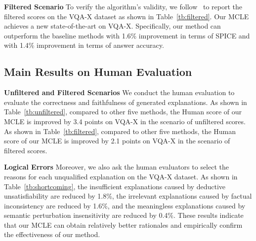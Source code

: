 \documentclass[letterpaper]{article} %
\begin{document}
\noindent
\textbf{Filtered Scenario} To verify the algorithm's validity, we follow~\cite{kayser2021vil} to report the filtered scores on the VQA-X dataset as shown in Table~\ref{tb:filtered}. Our MCLE achieves a new state-of-the-art on VQA-X. Specifically, our method can outperform the baseline methods with 1.6\% improvement in terms of SPICE and with 1.4\% improvement in terms of answer accuracy.

\subsection{Main Results on Human Evaluation}

\noindent
\textbf{Unfiltered and Filtered Scenarios} We conduct the human evaluation to evaluate the correctness and faithfulness of generated explanations. As shown in Table~\ref{tb:unfiltered}, compared to other five methods, the Human score of our MCLE is improved by 3.4 points on VQA-X in the scenario of unfiltered scores. As shown in Table~\ref{tb:filtered}, compared to other five methods, the Human score of our MCLE is improved by 2.1 points on VQA-X in the scenario of filtered scores.

\noindent
\textbf{Logical Errors} Moreover, we also ask the human evaluators to select the reasons for each unqualified explanation on the VQA-X dataset. As shown in Table~\ref{tb:shortcoming}, the insufficient explanations caused by deductive unsatisfiability are reduced by 1.8\%, the irrelevant explanations caused by factual inconsistency are reduced by 1.6\%, and the meaningless explanations caused by semantic perturbation insensitivity are reduced by 0.4\%. These results indicate that our MCLE can obtain relatively better rationales and empirically confirm the effectiveness of our method.
\end{document}
